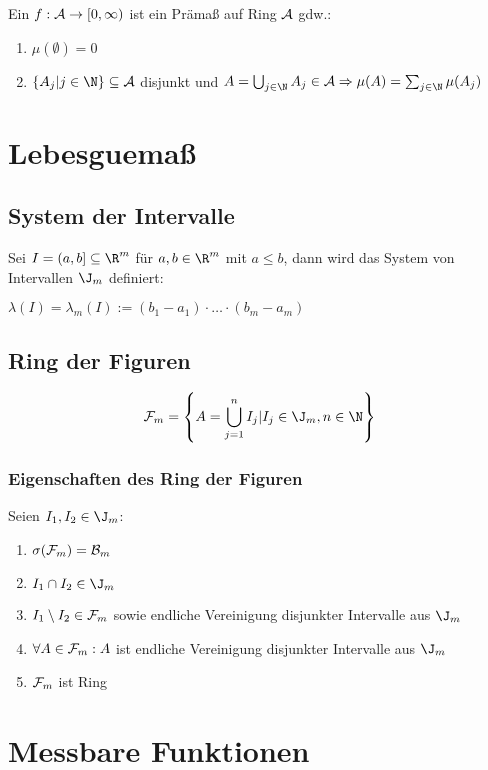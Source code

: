 Ein $f : \mathcal{A} \to [0, \infty)$ ist ein Prämaß auf Ring $\mathcal{A}$ gdw.:

\begin{enumerate}[label=(\alph*)]
	\item $\mu(\emptyset) = 0$
	\item $\{A_j | j \in \N\} \subseteq \A$ disjunkt und $A = \bigcup_{j\in \N} A_j \in \A \Rightarrow \mu(A) = \sum_{j\in \N} \mu(A_j)$
\end{enumerate}

\section*{Lebesguemaß}

\subsection*{System der Intervalle}

Sei $I = (a, b] \subseteq \R^m$ für $a, b \in \R^m$ mit $a \leq b$, dann wird das System von Intervallen $\J_m$ definiert:

$\lambda(I) = \lambda_m(I) := (b_1 - a_1) \cdot \hdots \cdot (b_m - a_m)$

\subsection*{Ring der Figuren}

\[ \F_m = \left\{ A = \bigcup_{j=1}^n I_j | I_j \in \J_m, n \in \N \right\} \]

\subsubsection*{Eigenschaften des Ring der Figuren}

Seien $I_1, I_2 \in \J_m$:

\begin{enumerate}[label=(\alph*)]
	\item $\sigma(\mathcal{F}_m) = \mathcal{B}_m$
	\item $I_1 \cap I_2 \in \J_m$
	\item $I_1 \setminus I_2 \in \mathcal{F}_m$ sowie endliche Vereinigung disjunkter Intervalle aus $\J_m$
	\item $\forall A \in \mathcal{F}_m: A$ ist endliche Vereinigung disjunkter Intervalle aus $\J_m$
	\item $\mathcal{F}_m$ ist Ring
\end{enumerate}

\section*{Messbare Funktionen}

